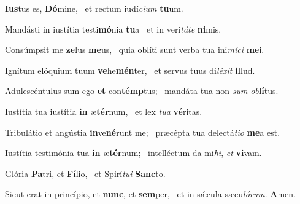 \item \textbf{Ius}tus es, \textbf{Dó}mine,~\psstar{} et rectum iudí\textit{cium} \textbf{tu}um.

\item Mandásti in iustítia testi\textbf{mó}nia \textbf{tu}a~\psstar{} et in veri\textit{táte} \textbf{ni}mis.

\item Consúmpsit me \textbf{ze}lus \textbf{me}us,~\psstar{} quia oblíti sunt verba tua ini\textit{míci} \textbf{me}i.

\item Ignítum elóquium tuum \textbf{ve}he\textbf{mén}ter,~\psstar{} et servus tuus di\textit{léxit} \textbf{il}lud.

\item Adulescéntulus sum ego \textbf{et} con\textbf{témp}tus;~\psstar{} mandáta tua non \textit{sum} \textit{ob}\textbf{lí}tus.

\item Iustítia tua iustítia \textbf{in} æ\textbf{tér}num,~\psstar{} et lex \textit{tua} \textbf{vé}ritas.

\item Tribulátio et angústia \textbf{in}ve\textbf{né}runt me;~\psstar{} præcépta tua delectá\textit{tio} \textbf{me}a est.

\item Iustítia testimónia tua \textbf{in} æ\textbf{tér}num;~\psstar{} intelléctum da mi\textit{hi}, \textit{et} \textbf{vi}vam.

\item Glória \textbf{Pa}tri, et \textbf{Fí}lio,~\psstar{} et Spirí\textit{tui} \textbf{Sanc}to.

\item Sicut erat in princípio, et \textbf{nunc}, et \textbf{sem}per,~\psstar{} et in sǽcula sæcu\textit{lórum}. \textbf{A}men.